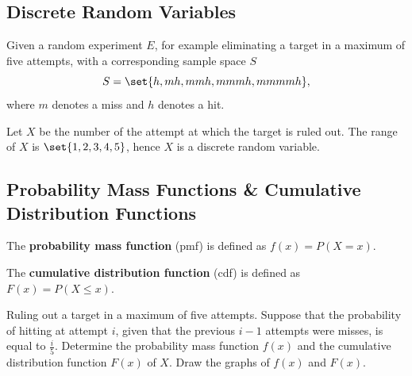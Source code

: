 \subsection*{Discrete Random Variables}

Given a random experiment $E$, for example eliminating a target in a maximum of five attempts, with a corresponding sample space $S$
\[
    S = \set{h, mh, mmh, mmmh, mmmmh},
\]
where $m$ denotes a miss and $h$ denotes a hit. 

Let $X$ be the number of the attempt at which the target is ruled out.
The range of $X$ is $\set{1,2,3,4,5}$, hence $X$ is a discrete random variable.

\subsection*{Probability Mass Functions \& Cumulative Distribution Functions}

\begin{definition}
    The \textbf{probability mass function} (pmf) is defined as $f(x) = P(X = x)$.

    The \textbf{cumulative distribution function} (cdf) is defined as $F(x) = P(X \le x)$.
\end{definition}

\begin{example}
    Ruling out a target in a maximum of five attempts.
    Suppose that the probability of hitting at attempt $i$, given that the previous $i-1$ attempts were misses, is equal to $\frac{i}{5}$.
    Determine the probability mass function $f(x)$ and the cumulative distribution function $F(x)$ of $X$.
    Draw the graphs of $f(x)$ and $F(x)$.
\end{example}

